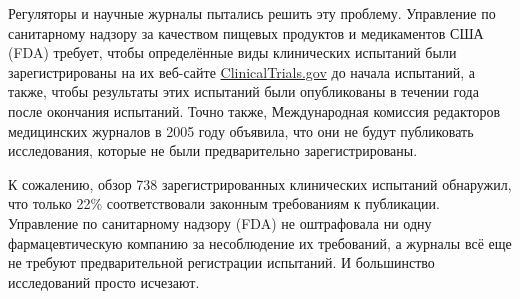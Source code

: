 Регуляторы и научные журналы пытались решить эту проблему. Управление по санитарному надзору за качеством пищевых продуктов и медикаментов США (FDA) требует, чтобы определённые виды клинических испытаний были зарегистрированы на их веб-сайте \href{https://clinicaltrials.gov/}{ClinicalTrials.gov} до начала испытаний, а также, чтобы результаты этих испытаний были опубликованы в течении года после окончания испытаний. Точно также, Международная комиссия редакторов медицинских журналов в 2005 году объявила, что они не будут публиковать исследования, которые не были предварительно зарегистрированы.

К сожалению, обзор 738 зарегистрированных клинических испытаний обнаружил, что только 22\% соответствовали законным требованиям к публикации. \cite{prayle_compliance_2012} Управление по санитарному надзору (FDA) не оштрафовала ни одну фармацевтическую компанию за несоблюдение их требований, а журналы всё еще не требуют предварительной регистрации испытаний. И большинство исследований просто исчезают.
